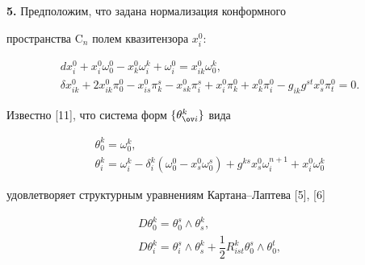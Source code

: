 {\bf 5.} Предположим, что задана нормализация конформного 


пространства $\mathrm C_n$ полем квазитензора $x^0_i$: 


\begin{equation} 


\begin{array}{c} 


dx^0_i+x^0_i\omega^0_0-x^0_k\omega^k_i+ 


\omega^0_i=x^0_{ik}\omega^k_0,\\[2mm] 


\delta x^0_{ik}+2x^0_{ik}\pi^0_0-x^0_{is}\pi^s_k- 


x^0_{sk}\pi^s_i+x^0_i\pi^0_k+x^0_k\pi^0_i- 


g_{ik}g^{st}x^0_s\pi^0_t=0. 


\end{array} 


\end{equation} 


Известно [11], что система форм $\{\theta^k_{\ov i}\}$ вида


\begin{equation} 


\begin{array}{c} 


\theta^k_0=\omega^k_0,\\[2mm] 


\theta^k_i=\omega^k_i-\delta^k_i(\omega^0_0-x^0_s\omega^s_0)+ 


g^{ks}x^0_s\omega^{n+1}_i+x^0_i\omega^k_0 


\end{array} 


\end{equation} 


удовлетворяет структурным уравнениям Картана--Лаптева [5], [6] 


\begin{equation} 


\begin{array}{c} 


D\theta^k_0=\theta^s_0\wedge\theta^k_s,\\[3mm] 


D\theta^k_i=\theta^s_i\wedge\theta^k_s+\dfrac{1}{2} 


R^k_{ist}\theta^s_0\wedge\theta^t_0, 


\end{array} 


\end{equation} 



